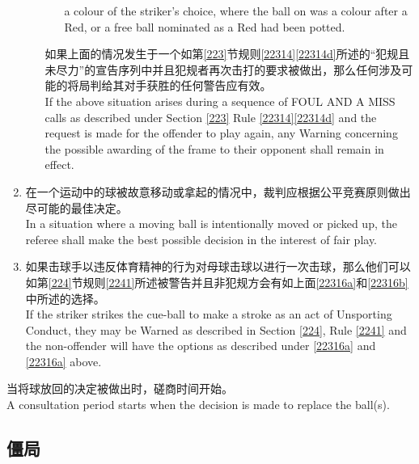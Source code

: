 \begin{enumerate}[label=(\alph*)]
\begin{enumerate}[label=(\roman*)]
\begin{enumerate}[label=(\roman*)]
            a colour of the striker's choice, where the ball on was a colour after a Red, or a free ball nominated as a Red had been potted.
        \end{enumerate}
        如果上面的情况发生于一个如第\ref{223}节规则\ref{22314}\ref{22314d}所述的``犯规且未尽力''的宣告序列中并且犯规者再次击打的要求被做出，那么任何涉及可能的将局判给其对手获胜的任何警告应有效。\\
        If the above situation arises during a sequence of FOUL AND A MISS calls as described under Section \ref{223} Rule \ref{22314}\ref{22314d} and the request is made for the offender to play again, any Warning concerning the possible awarding of the frame to their opponent shall remain in effect.
    \end{enumerate}
    \item \label{22316b}在一个运动中的球被故意移动或拿起的情况中，裁判应根据公平竞赛原则做出尽可能的最佳决定。\\
    In a situation where a moving ball is intentionally moved or picked up, the referee shall make the best possible decision in the interest of fair play.
    \item 如果击球手以违反体育精神的行为对母球击球以进行一次击球，那么他们可以如第\ref{224}节规则\ref{2241}所述被警告并且非犯规方会有如上面\ref{22316a}和\ref{22316b}中所述的选择。\\
    If the striker strikes the cue-ball to make a stroke as an act of Unsporting Conduct, they may be Warned as described in Section \ref{224}, Rule \ref{2241} and the non-offender will have the options as described under \ref{22316a} and \ref{22316a} above.
\end{enumerate}
\noindent 当将球放回的决定被做出时，磋商时间开始。\\
A consultation period starts when the decision is made to replace the ball(s).

\subsection{僵局}\label{22317}

